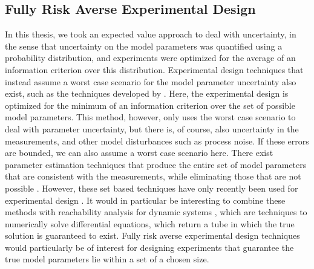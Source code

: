 \subsection{Fully Risk Averse Experimental Design}
In this thesis, we took an expected value approach to deal with uncertainty, in the sense that uncertainty on the model parameters was quantified using a probability distribution, and experiments were optimized for the average of an information criterion over this distribution. Experimental design techniques that instead assume a worst case scenario for the model parameter uncertainty also exist, such as the techniques developed by \textcite{bauer}. Here, the experimental design is optimized for the minimum of an information criterion over the set of possible model parameters. This method, however, only uses the worst case scenario to deal with parameter uncertainty, but there is, of course, also uncertainty in the measurements, and other model disturbances such as process noise. If these errors are bounded, we can also assume a worst case scenario here. There exist parameter estimation techniques that produce the entire set of model parameters that are consistent with the measurements, while eliminating those that are not possible \parencite{jaulin}. However, these set based techniques have only recently been used for experimental design \parencite{jauberthie}. It would in particular be interesting to combine these methods with reachability analysis for dynamic systems \parencite{juliareach}, which are techniques to numerically solve differential equations, which return a tube in which the true solution is guaranteed to exist. Fully risk averse experimental design techniques would particularly be of interest for designing experiments that guarantee the true model parameters lie within a set of a chosen size.  
